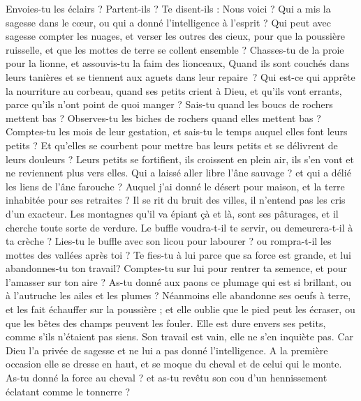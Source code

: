 \begin{multicols}{2}
Envoies-tu les éclairs ? Partent-ils ? Te disent-ils : Nous voici ?
Qui a mis la sagesse dans le cœur, ou qui a donné l'intelligence à l'esprit ?
Qui peut avec sagesse compter les nuages, et verser les outres des cieux,
pour que la poussière ruisselle, et que les mottes de terre se collent ensemble ?
\VerseOne{}Chasses-tu de la proie pour la lionne, et assouvis-tu la faim des lionceaux,
Quand ils sont couchés dans leurs tanières et se tiennent aux aguets dans leur repaire ?
Qui est-ce qui apprête la nourriture au corbeau, quand ses petits crient à Dieu, et qu'ils vont errants, parce qu'ils n'ont point de quoi manger ?
Sais-tu quand les boucs de rochers mettent bas ? Observes-tu les biches de rochers quand elles mettent bas ?
Comptes-tu les mois de leur gestation, et sais-tu le temps auquel elles font leurs petits ?
Et qu'elles se courbent pour mettre bas leurs petits et se délivrent de leurs douleurs ?
Leurs petits se fortifient, ils croissent en plein air, ils s’en vont et ne reviennent plus vers elles.
Qui a laissé aller libre l’âne sauvage ? et qui a délié les liens de l’âne farouche ?
Auquel j’ai donné le désert pour maison, et la terre inhabitée pour ses retraites ?
Il se rit du bruit des villes, il n'entend pas les cris d'un exacteur.
Les montagnes qu'il va épiant çà et là, sont ses pâturages, et il cherche toute sorte de verdure. 
Le buffle voudra-t-il te servir, ou demeurera-t-il à ta crèche ? 
Lies-tu le buffle avec son licou pour labourer ? ou rompra-t-il les mottes des vallées après toi ? 
Te fies-tu à lui parce que sa force est grande, et lui abandonnes-tu ton travail? 
Comptes-tu sur lui pour rentrer ta semence, et pour l'amasser sur ton aire ? 
As-tu donné aux paons ce plumage qui est si brillant, ou à l'autruche les ailes et les plumes ? 
Néanmoins elle abandonne ses oeufs à terre, et les fait échauffer sur la poussière ;
et elle oublie que le pied peut les écraser, ou que les bêtes des champs peuvent les fouler. 
Elle est dure envers ses petits, comme s’ils n’étaient pas siens. Son travail est vain, elle ne s’en inquiète pas.
Car Dieu l'a privée de sagesse et ne lui a pas donné l'intelligence.
A la première occasion elle se dresse en haut, et se moque du cheval et de celui qui le monte. 
As-tu donné la force au cheval ? et as-tu revêtu son cou d'un hennissement éclatant comme le tonnerre ? 

\end{multicols}
